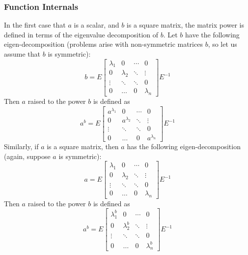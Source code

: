 \subsubsection{Function Internals}
In the first case that $a$ is a scalar, and $b$ is a square matrix, the matrix power is defined in terms of the eigenvalue decomposition of $b$.  Let $b$ have the following eigen-decomposition (problems arise with non-symmetric matrices $b$, so let us assume that $b$ is symmetric):
\[
  b = E \begin{bmatrix} \lambda_1 & 0          & \cdots  & 0 \\
                              0   & \lambda_2  &  \ddots & \vdots \\
                              \vdots & \ddots & \ddots & 0 \\
                              0   & \hdots & 0 & \lambda_n \end{bmatrix}
      E^{-1}
\]
Then $a$ raised to the power $b$ is defined as
\[
  a^{b} = E \begin{bmatrix} a^{\lambda_1} & 0          & \cdots  & 0 \\
                              0   & a^{\lambda_2}  &  \ddots & \vdots \\
                              \vdots & \ddots & \ddots & 0 \\
                              0   & \hdots & 0 & a^{\lambda_n} \end{bmatrix}
      E^{-1}
\]
Similarly, if $a$ is a square matrix, then $a$ has the following eigen-decomposition (again, suppose $a$ is symmetric):
\[
  a = E \begin{bmatrix} \lambda_1 & 0          & \cdots  & 0 \\
                              0   & \lambda_2  &  \ddots & \vdots \\
                              \vdots & \ddots & \ddots & 0 \\
                              0   & \hdots & 0 & \lambda_n \end{bmatrix}
      E^{-1}
\]
Then $a$ raised to the power $b$ is defined as
\[
  a^{b} = E \begin{bmatrix} \lambda_1^b & 0          & \cdots  & 0 \\
                              0   & \lambda_2^b  &  \ddots & \vdots \\
                              \vdots & \ddots & \ddots & 0 \\
                              0   & \hdots & 0 & \lambda_n^b \end{bmatrix}
      E^{-1}
\]
